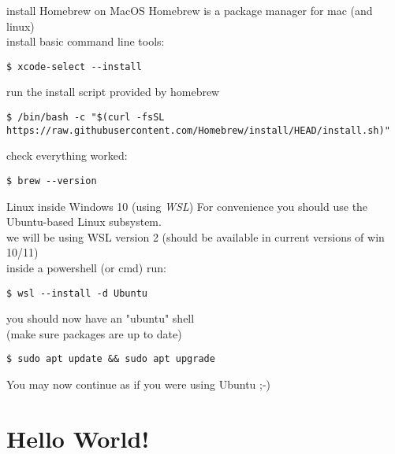 \begin{frame}[fragile]{install Homebrew on MacOS}
	Homebrew is a package manager for mac (and linux)\\
	\bigskip
	install basic command line tools:
	\begin{lstlisting}[numbers=none]
$ xcode-select --install
\end{lstlisting}
	run the install script provided by homebrew
	\begin{lstlisting}[numbers=none]
$ /bin/bash -c "$(curl -fsSL https://raw.githubusercontent.com/Homebrew/install/HEAD/install.sh)"
\end{lstlisting}
	check everything worked:
	\begin{lstlisting}[numbers=none]
$ brew --version
\end{lstlisting}
\end{frame}

\begin{frame}[fragile]{Linux inside Windows 10 (using \textit{WSL})}
	For convenience you should use the Ubuntu-based Linux subsystem.\\
	\bigskip
	we will be using WSL version 2 (should be available in current versions of win 10/11)\\
	\bigskip
	inside a powershell (or cmd) run:
	\begin{lstlisting}[numbers=none]
$ wsl --install -d Ubuntu
\end{lstlisting}
	you should now have an "ubuntu" shell\\
	\bigskip
	(make sure packages are up to date)
	\begin{lstlisting}[numbers=none]
$ sudo apt update && sudo apt upgrade
\end{lstlisting}
	You may now continue as if you were using Ubuntu ;-)
\end{frame}

\section{Hello World!}
